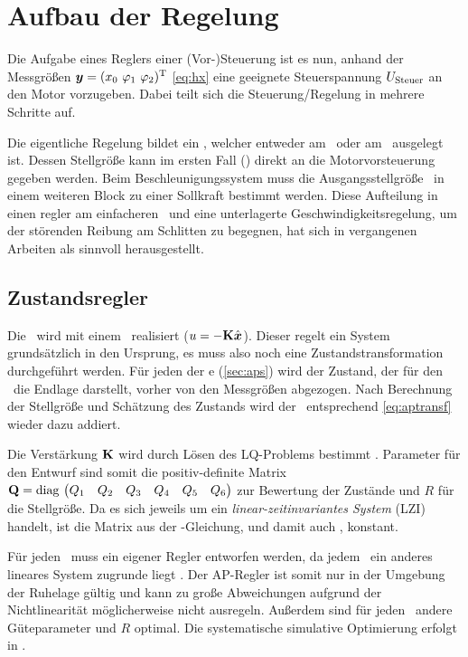 \section{Aufbau der Regelung}\label{sec:aufbaureg}

Die Aufgabe eines Reglers \bzw einer (Vor-)Steuerung ist es nun, anhand der Messgrößen $\vey=(\xo\ \phe\ \phz)^{\transp}$ \eqref{eq:hx} eine geeignete Steuerspannung $U_{\mathrm{Steuer}}$ an den Motor vorzugeben. Dabei teilt sich die Steuerung/Regelung in mehrere Schritte auf. 

Die eigentliche Regelung bildet ein \zsr, welcher entweder am \krs\ oder am \bss\ ausgelegt ist. 
Dessen Stellgröße kann im ersten Fall (\fsoll) direkt an die Motorvorsteuerung gegeben werden.
Beim Beschleunigungssystem muss die Ausgangsstellgröße \asoll\ in einem weiteren Block zu einer Sollkraft bestimmt werden.
Diese Aufteilung in einen \ap regler am einfacheren \bss\ und eine unterlagerte Geschwindigkeitsregelung, um der störenden Reibung am Schlitten zu begegnen, hat sich in vergangenen Arbeiten als sinnvoll herausgestellt.


\subsection{Zustandsregler}\label{subsec:zsr} 

Die \aprg\ wird mit einem \zsr\ realisiert ($u=-{\boldsymbol{\mathrm{K}}} \hat{\boldsymbol{x}}$). 
Dieser regelt ein System grundsätzlich in den Ursprung, es muss also noch eine Zustandstransformation durchgeführt werden. 
Für jeden der \ap e (\ref{sec:aps}) wird der Zustand, der für den \zsr\ die Endlage darstellt, vorher von den Messgrößen abgezogen. 
Nach Berechnung der Stellgröße und Schätzung des Zustands wird der \ap\ entsprechend \eqref{eq:aptransf} wieder dazu addiert.

Die Verstärkung ${\boldsymbol{\mathrm{K}}}$ wird durch Lösen des LQ-Problems bestimmt \cite{AdamyRT2}. Parameter für den Entwurf sind somit die positiv-definite Matrix 
${\boldsymbol{\mathrm{Q}}}=\mathrm{diag} \, \left(\begin{matrix} Q_1 & Q_2 & Q_3 & Q_4 & Q_5 & Q_6 \end{matrix}\right)$
 zur Bewertung der Zustände und $R$ für die Stellgröße. 
Da es sich jeweils um ein \emph{linear-zeitinvariantes System} (LZI) handelt, ist die Matrix  aus der \ricc-Gleichung, und damit auch , konstant.

Für jeden \ap\ muss ein eigener Regler entworfen werden, da jedem \ap\ ein anderes lineares System zugrunde liegt .
Der AP-Regler ist somit nur in der Umgebung der Ruhelage gültig und kann zu große Abweichungen aufgrund der Nichtlinearität möglicherweise nicht ausregeln.
Außerdem sind für jeden \ap\ andere Güteparameter  und $R$ optimal. Die systematische simulative Optimierung erfolgt in .

